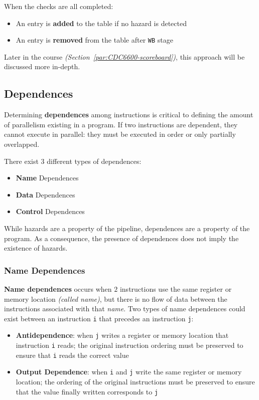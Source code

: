 \documentclass[english]{article}
\begin{document}
When the checks are all completed:

\begin{itemize}
  \item An entry is \textbf{added} to the table if no hazard is detected
  \item An entry is \textbf{removed} from the table after \texttt{WB} stage
\end{itemize}

\bigskip
Later in the course \textit{(Section~\ref{par:CDC6600-scoreboard})}, this approach will be discussed more in-depth.

\subsection{Dependences}

Determining \textbf{dependences} among instructions is critical to defining the amount of parallelism existing in a program.
If two instructions are dependent, they cannot execute in parallel: they must be executed in order or only partially overlapped.

There exist \(3\) different types of dependences:

\begin{itemize}
  \item \textbf{Name} Dependences
  \item \textbf{Data} Dependences
  \item \textbf{Control} Dependences
\end{itemize}

While hazards are a property of the pipeline, dependences are a property of the program.
As a consequence, the presence of dependences does not imply the existence of hazards.

\subsubsection{Name Dependences}

\textbf{Name dependences} occurs when \(2\) instructions use the same register or memory location \textit{(called name)}, but there is no flow of data between the instructions associated with that \textit{name}.
Two types of name dependences could exist between an instruction \texttt{i} that precedes an instruction \texttt{j}:

\begin{itemize}
  \item \textbf{Antidependence}: when \texttt{j} writes a register or memory location that instruction \texttt{i} reads; the original instruction ordering must be preserved to ensure that \texttt{i} reads the correct value
  \item \textbf{Output Dependence}: when \texttt{i} and \texttt{j} write the same register or memory location; the ordering of the original instructions must be preserved to ensure that the value finally written corresponds to \texttt{j}
\end{itemize}
\end{document}

